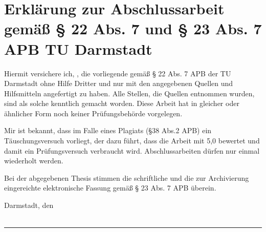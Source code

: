 \chapter*{Erklärung zur Abschlussarbeit gemäß § 22 Abs. 7 und § 23 Abs. 7 APB TU Darmstadt }

Hiermit versichere ich, \yourName{}, die vorliegende \yourCourseOfStudies{} gemäß § 22 Abs. 7 APB der TU Darmstadt ohne Hilfe Dritter und nur mit den angegebenen Quellen und Hilfsmitteln angefertigt zu haben. Alle Stellen, die Quellen entnommen wurden, sind als solche kenntlich gemacht worden. Diese Arbeit hat in gleicher oder ähnlicher Form noch keiner Prüfungsbehörde vorgelegen.

Mir ist bekannt, dass im Falle eines Plagiats (§38 Abs.2 APB) ein Täuschungsversuch vorliegt, der dazu führt, dass die Arbeit mit 5,0 bewertet und damit ein Prüfungsversuch verbraucht wird. Abschlussarbeiten dürfen nur einmal wiederholt werden.

Bei der abgegebenen Thesis stimmen die schriftliche und die zur Archivierung eingereichte elektronische Fassung gemäß § 23 Abs. 7 APB überein.

\vspace{2cm}
\hfill \parbox{6cm}{Darmstadt, den \yourSubmissionDate{} \\ \\ \phantom{.}}
\parbox{6cm}{\centering\hrule\medskip \yourName{}}
